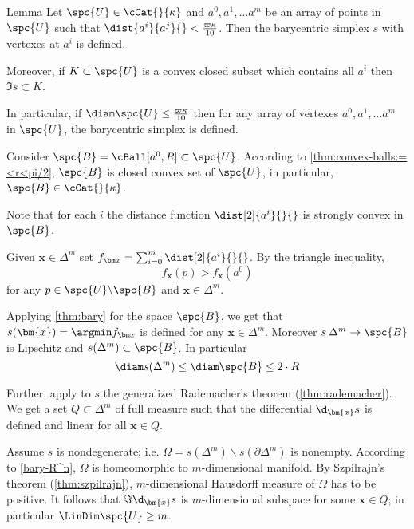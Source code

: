 \begin{thm}{Lemma}\label{lem:bary-cat}
Let $\spc{U}\in\cCat{}{\kappa}$
and $a^0,a^1,\dots a^m$ be an array of points in $\spc{U}$ such that
$\dist{a^i}{a^j}{}< \tfrac{\varpi\kappa}{10}$. 
Then the barycentric simplex $s$ with vertexes at $a^i$ is defined.

Moreover, if $K\subset \spc{U}$ is a convex closed subset which contains all $a^i$
then $\Im s\subset K$.

In particular, if $\diam \spc{U}\le \tfrac{\varpi\kappa}{10}$
then for any array of vertexes $a^0,a^1,\dots a^m$ in $\spc{U}$,
the barycentric simplex is defined.
\end{thm}

Consider $\spc{B}=\cBall[a^0,R]\subset\spc{U}$.
According to \ref{thm:convex-balls:=<r<pi/2}, $\spc{B}$ is closed convex set of $\spc{U}$,
in particular, $\spc{B}\in\cCat{}{\kappa}$.

Note that for each $i$ the distance function $\dist[2]{a^i}{}{}$ is strongly convex in $\spc{B}$.

Given $\bm{x}\in\Delta^m$ set $f_{\bm x}=\sum_{i=0}^m \dist[2]{a^i}{}{}$.
By the triangle inequality, 
$$f_{\bm x}(p)> f_{\bm x}(a^0)$$
for any $p\in\spc{U}\backslash\spc{B}$
and $\bm{x}\in\Delta^m$.

Applying \ref{thm:bary} for the space $\spc{B}$, we get that
$s(\bm{x})=\argmin f_{\bm x}$
is defined for any $\bm{x}\in\Delta^m$.
Moreover $s\:\Delta^m\to\spc{B}$ is Lipschitz
 and $s(\Delta^m)\subset \spc{B}$.
In particular 
$$\diam s(\Delta^m)
\le
\diam \spc{B}
\le
2\cdot R$$ 

Further, apply to $s$ the generalized Rademacher's theorem (\ref{thm:rademacher}).
We get a set $Q\subset\Delta^m$ of full measure such that
the differential $\d_{\bm{x}}s$ is defined and linear for all $\bm{x}\in Q$.

Assume $s$ is nondegenerate; 
i.e. $\Omega=s(\Delta^m)\backslash s(\partial\Delta^m)$ is nonempty.
According to \ref{bary-R^n}, $\Omega$ is homeomorphic to $m$-dimensional manifold.
By Szpilrajn's theorem (\ref{thm:szpilrajn}), $m$-dimensional Hausdorff measure of $\Omega$ has to be positive.
It follows %
that  $\Im\d_{\bm{x}}s$ is $m$-dimensional subspace for some $\bm{x}\in Q$;
in particular $\LinDim \spc{U}\ge m$.
\qeds















